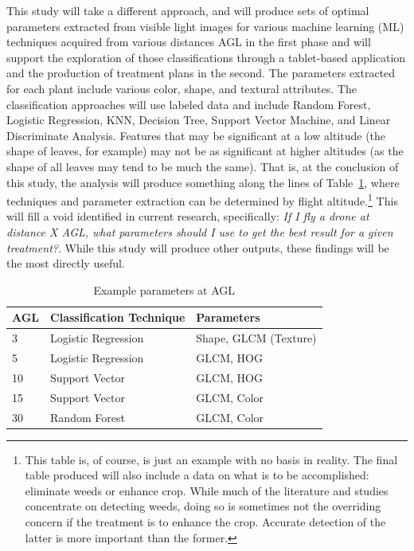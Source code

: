\documentclass[12pt]{article}
\begin{document}
This study will take a different approach, and will produce sets of optimal parameters extracted from visible light images for various machine learning (ML) techniques acquired from various distances AGL in the first phase and will support the exploration of those classifications through a tablet-based application and the production of treatment plans in the second. The parameters extracted for each plant include various color, shape, and textural attributes. The classification approaches will use labeled data and include Random Forest, Logistic Regression, KNN, Decision Tree, Support Vector Machine, and Linear Discriminate Analysis. Features that may be significant at a low altitude (the shape of leaves, for example) may not be as significant at higher altitudes (as the shape of all leaves may tend to be much the same). That is, at the conclusion of this study, the analysis will produce something along the lines of Table~\ref{tab:example}, where techniques and parameter extraction can be determined by flight altitude.\footnote{This table is, of course, is just an example with no basis in reality. The final table produced will also include a data on what is to be accomplished: eliminate weeds or enhance crop. While much of the literature and studies concentrate on detecting weeds, doing so is sometimes not the overriding concern if the treatment is to enhance the crop. Accurate detection of the latter is more important than the former.} This will fill a void identified in current research, specifically: \textit{If I fly a drone at distance X AGL, what parameters should I use to get the best result for a given treatment?}. While this study will produce other outputs, these findings will be the most directly useful.
 \begin{table}[h]
	\centering
    \caption{Example parameters at AGL}
    \label{tab:example}
    \begin{tabular}[t]{lll} 
		\textbf{AGL} & \textbf{Classification Technique} &\textbf{Parameters}\\
		\midrule
			3 & Logistic Regression & Shape, GLCM (Texture)\\
			5 & Logistic Regression & GLCM, HOG\\
			10 & Support Vector & GLCM, HOG\\
			15 & Support Vector & GLCM, Color\\
			30 & Random Forest & GLCM, Color\\
    \end{tabular}
\end{table}
\end{document}
